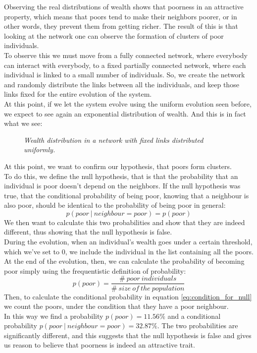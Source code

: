 Observing the real distributions of wealth shows that poorness in an attractive property, which means that poors tend to make their neighbors poorer, or in other words, they prevent them from getting richer. The result of this is that looking at the network one can observe the formation of clusters of poor individuals. \\
To observe this we must move from a fully connected network, where everybody can interact with everybody, to a fixed partially connected network, where each individual is linked to a small number of individuals. So, we create the network and randomly distribute the links between all the individuals, and keep those links fixed for the entire evolution of the system. \\
At this point, if we let the system evolve using the uniform evolution seen before, we expect to see again an exponential distribution of wealth. And this is in fact what we see:
\begin{figure}[ht!]
    \centering
    \scalebox{.7}{}
    \caption{\emph{Wealth distribution in a network with fixed links distributed uniformly.}}
    \label{fig:fixedExpo}
\end{figure}
At this point, we want to confirm our hypothesis, that poors form clusters. \\
To do this, we define the null hypothesis, that is that the probability that an individual is poor doesn't depend on the neighbors. If the null hypothesis was true, that the conditional probability of being poor, knowing that a neighbour is also poor, should be identical to the probability of being poor in general:
$$
	p(poor \ | \ neighbour=poor) = p(poor)
	\label{eq:condition_for_null}
$$
We then want to calculate this two probabilities and show that they are indeed different, thus showing that the null hypothesis is false. \\
During the evolution, when an individual's wealth goes under a certain threshold, which we've set to $0$, we include the individual in the list containing all the poors. At the end of the evolution, then, we can calculate the probability of becoming poor simply using the frequentistic definition of probability:
$$
	p(poor) = \frac{\# \ poor \ individuals}{\# \ size \ of \ the \ population}
$$
Then, to calculate the conditional probability in equation \ref{eq:condition_for_null} we count the poors, under the condition that they have a poor neighbour. \\
In this way we find a probability $p(poor) = 11.56 \%$ and a conditional probability $p(poor \ | \ neighbour=poor) = 32.87 \%$. The two probabilities are significantly different, and this suggests that the null hypothesis is false and gives us reason to believe that poorness is indeed an attractive trait.
